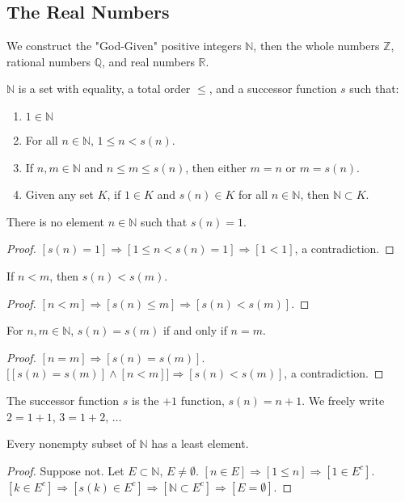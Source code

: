 \documentclass[crop=false,class=book]{standalone}
\begin{document}
\subsection{The Real Numbers}
We construct the "God-Given" positive integers $\mathbb{N}$, then the whole numbers $\mathbb{Z}$, rational numbers $\mathbb{Q}$, and real numbers $\mathbb{R}$.
\begin{definition}
$\mathbb{N}$ is a set with equality, a total order $\leq$, and a successor function $s$ such that:
\begin{enumerate}
\item $1\in \mathbb{N}$
\item For all $n\in \mathbb{N}$, $1\leq n < s(n)$.
\item If $n,m\in \mathbb{N}$ and $n\leq m \leq s(n)$, then either $m=n$ or $m=s(n)$.
\item Given any set $K$, if $1\in K$ and $s(n)\in K$ for all $n\in \mathbb{N}$, then $\mathbb{N}\subset K$.
\end{enumerate}
\end{definition}
\begin{theorem}
There is no element $n\in \mathbb{N}$ such that $s(n) =1$.
\end{theorem}
\begin{proof}
$[s(n) = 1]\Rightarrow [1\leq n < s(n)=1]\Rightarrow[1<1]$, a contradiction.
\end{proof}
\begin{theorem}
If $n<m$, then $s(n)< s(m)$.
\end{theorem}
\begin{proof}
$[n<m]\Rightarrow [s(n)\leq m] \Rightarrow [s(n) < s(m)]$.
\end{proof}
\begin{theorem}
For $n,m\in \mathbb{N}$, $s(n)=s(m)$ if and only if $n=m$.
\end{theorem}
\begin{proof}
$[n=m]\Rightarrow [s(n)=s(m)]$. $\big[[s(n)=s(m)]\land [n<m]\big] \Rightarrow [s(n)<s(m)]$, a contradiction.
\end{proof}
\begin{remark}
The successor function $s$ is the $+1$ function, $s(n)=n+1$. We freely write $2=1+1$, $3=1+2$, $\hdots$
\end{remark}
\begin{theorem}
Every nonempty subset of $\mathbb{N}$ has a least element.
\end{theorem}
\begin{proof}
Suppose not. Let $E\subset \mathbb{N}$, $E\ne\emptyset$. $[n\in E]\Rightarrow [1\leq n]\Rightarrow [1\in E^c]$. $[k\in E^c]\Rightarrow [s(k)\in E^c]\Rightarrow [\mathbb{N} \subset E^c]\Rightarrow [E = \emptyset]$.
\end{proof}
\end{document}
